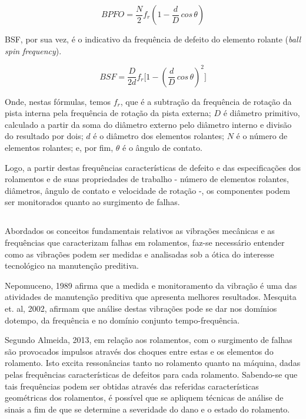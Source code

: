 \documentclass[
	12pt,				
	oneside,			
	a4paper,			
	english,			
	brazil,			
	]{abntex2ppgsi}
\begin{document}
\begin{equation}
	BPFO = \frac{N}{2}f_{r} \left ( 1 - \frac{d}{D} \,cos \, \theta \right )
	\label{eq: BPFO}
\end{equation}

BSF, por sua vez, é o indicativo da frequência de defeito do elemento rolante (\textit{ball spin frequency}).

\begin{equation}
	BSF = \frac{D}{2d}f_{r} \Bigg[  1 - \left ( \frac{d}{D} \,cos \, \theta \right ) ^{2}  \Bigg]
	\label{eq: BSF}
\end{equation}

Onde, nestas fórmulas, temos $f_{r}$, que é a subtração da frequência de rotação da pista interna pela frequência de rotação da pista externa; $D$ é diâmetro primitivo, calculado a partir da soma do diâmetro externo pelo diâmetro interno e divisão do resultado por dois; $d$ é o diâmetro dos elementos rolantes; $N$ é o número de elementos rolantes; e, por fim, $\theta$ é o ângulo de contato.

Logo, a partir destas frequências características de defeito e das especificações dos rolamentos e de suas propriedades de trabalho - número de elementos rolantes, diâmetros, ângulo de contato e velocidade de rotação -, os componentes podem ser monitorados quanto ao surgimento de falhas.  

\subsection{}

Abordados os conceitos  fundamentais relativos as vibrações mecânicas e as frequências que caracterizam falhas em rolamentos, faz-se necessário entender como as vibrações podem ser medidas e analisadas sob a ótica do interesse tecnológico na manutenção preditiva. 

Nepomuceno, 1989 afirma que a medida e monitoramento da vibração é uma das atividades de manutenção preditiva que apresenta melhores resultados. Mesquita et. al, 2002, afirmam que análise destas vibrações pode se dar nos domínios dotempo, da frequência e no domínio conjunto tempo-frequência.

Segundo Almeida, 2013, em relação aos rolamentos, com o surgimento de falhas são provocados impulsos através dos choques entre estas e os elementos do rolamento. Isto excita ressonâncias tanto no rolamento quanto na máquina, dadas pelas frequências características de defeitos para cada rolamento. Sabendo-se que tais frequências podem ser obtidas através das referidas características geométricas dos rolamentos, é possível que se apliquem técnicas de análise de sinais a fim de que se determine a severidade do dano e o estado do rolamento.
\end{document}
